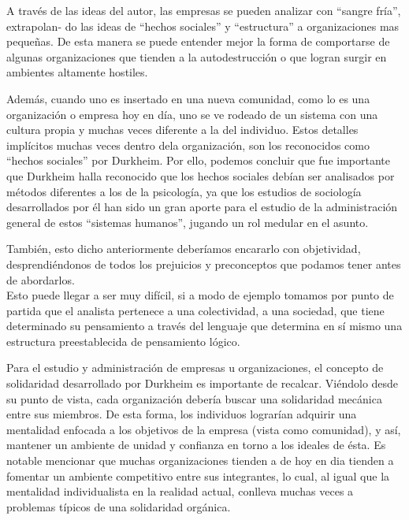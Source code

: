 A trav\'es de las ideas del autor, las empresas se pueden analizar con ``sangre fr\'ia'', extrapolan-
do las ideas de ``hechos sociales'' y ``estructura'' a organizaciones mas pequeñas. De esta manera se
puede entender mejor la forma de comportarse de algunas organizaciones que tienden
a la autodestrucci\'on o que logran surgir en ambientes altamente hostiles.

Adem\'as, cuando uno es insertado en una nueva comunidad, como lo es una organizaci\'on o empresa hoy en d\'ia, uno 
se ve rodeado de un sistema con una cultura propia y muchas veces diferente a la del individuo. Estos 
detalles impl\'icitos muchas veces dentro dela organizaci\'on, son los reconocidos como ``hechos sociales''
por Durkheim. Por ello, podemos concluir que fue importante que Durkheim halla reconocido que los 
hechos sociales deb\'ian ser analisados por m\'etodos diferentes a los de la psicolog\'ia, ya que los estudios 
de sociolog\'ia desarrollados por \'el han sido un gran aporte para el estudio de la administraci\'on general 
de estos ``sistemas humanos'', jugando un rol medular en el asunto. 

Tambi\'en, esto dicho anteriormente  deber\'iamos encararlo con objetividad, desprendiéndonos de todos los prejuicios y preconceptos que podamos tener antes de abordarlos.\\
Esto puede llegar a ser muy difícil, si a modo de ejemplo tomamos por punto de partida que el analista pertenece a una colectividad, a una sociedad, que tiene determinado su pensamiento a través del lenguaje que determina en sí mismo una estructura preestablecida de pensamiento lógico.


Para el estudio y administraci\'on de empresas u organizaciones, el concepto de solidaridad desarrollado
por Durkheim es importante de recalcar. Vi\'endolo desde su punto de vista, cada organizaci\'on deber\'ia 
buscar una solidaridad mec\'anica entre sus miembros. De esta forma, los individuos lograr\'ian adquirir 
una mentalidad enfocada a los objetivos de la empresa (vista como comunidad), y as\'i, mantener un 
ambiente de unidad y confianza en torno a los ideales de \'esta. Es notable mencionar que muchas 
organizaciones tienden a de hoy en dia tienden a fomentar un ambiente competitivo entre sus integrantes, 
lo cual, al igual que la mentalidad individualista en la realidad actual, conlleva muchas veces a problemas 
t\'ipicos de una solidaridad org\'anica.

